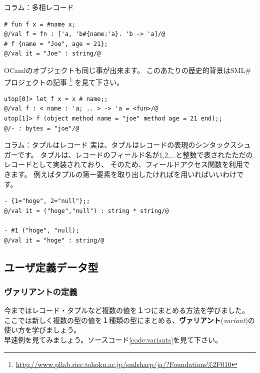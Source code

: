 \documentclass[11pt,a4paper]{jarticle}
\begin{document}
\begin{itembox}[l]{コラム：多相レコード}
\begin{lstlisting}[caption=SML\#の多相レコード,label=code:poly-record]
# fun f x = #name x;
@/val f = fn : ['a, 'b#{name:'a}. 'b -> 'a]/@
# f {name = "Joe", age = 21};
@/val it = "Joe" : string/@
\end{lstlisting}

  OCamlのオブジェクトも同じ事が出来ます。
  このあたりの歴史的背景はSML\#プロジェクトの記事  \footnote{\url{http://www.pllab.riec.tohoku.ac.jp/smlsharp/ja/?Foundations\%2F010}}
  を見て下さい。

\begin{lstlisting}[caption=OCamlのオブジェクト,label=code:ocaml-obj]
utop[0]> let f x = x # name;;
@/val f : < name : 'a; .. > -> 'a = <fun>/@
utop[1]> f (object method name = "joe" method age = 21 end);;
@/- : bytes = "joe"/@
\end{lstlisting}

\end{itembox}

\begin{itembox}[l]{コラム：タプルはレコード}
実は、タプルはレコードの表現のシンタックスシュガーです。
タプルは、レコードのフィールド名が1,2,...と整数で表されたただのレコードとして実装されており、
そのため、フィールドアクセス関数を利用できます。
例えばタプルの第一要素を取り出したければを用いればいいわけです。

\begin{lstlisting}[caption=タプルはレコード,label=code:tuple-is-record]
- {1="hoge", 2="null"};;
@/val it = ("hoge","null") : string * string/@

- #1 ("hoge", "null);
@/val it = "hoge" : string/@
\end{lstlisting}
\end{itembox}


\subsection{ユーザ定義データ型}
\subsubsection{ヴァリアントの定義}

今まではレコード・タプルなど複数の値を１つにまとめる方法を学びました。
ここでは新しく複数の型の値を１種類の型にまとめる、\textbf{ヴァリアント}(\textit{variant})の使い方を学びましょう。\\
早速例を見てみましょう。ソースコード\ref{code:variants}を見て下さい。
\end{document}
